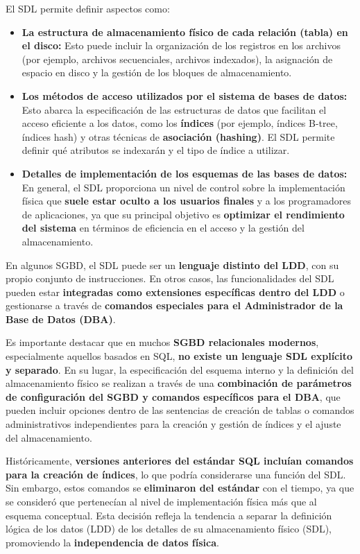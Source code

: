 El SDL permite definir aspectos como:

\begin{itemize}
    \item \textbf{La estructura de almacenamiento físico de cada relación (tabla) en el disco:} Esto puede incluir la organización de los registros en los archivos (por ejemplo, archivos secuenciales, archivos indexados), la asignación de espacio en disco y la gestión de los bloques de almacenamiento.

    \item \textbf{Los métodos de acceso utilizados por el sistema de bases de datos:} Esto abarca la especificación de las estructuras de datos que facilitan el acceso eficiente a los datos, como los \textbf{índices} (por ejemplo, índices B-tree, índices hash) y otras técnicas de \textbf{asociación (hashing)}. El SDL permite definir qué atributos se indexarán y el tipo de índice a utilizar.

    \item \textbf{Detalles de implementación de los esquemas de las bases de datos:} En general, el SDL proporciona un nivel de control sobre la implementación física que \textbf{suele estar oculto a los usuarios finales} y a los programadores de aplicaciones, ya que su principal objetivo es \textbf{optimizar el rendimiento del sistema} en términos de eficiencia en el acceso y la gestión del almacenamiento.
\end{itemize}

En algunos SGBD, el SDL puede ser un \textbf{lenguaje distinto del LDD}, con su propio conjunto de instrucciones. En otros casos, las funcionalidades del SDL pueden estar \textbf{integradas como extensiones específicas dentro del LDD} o gestionarse a través de \textbf{comandos especiales para el Administrador de la Base de Datos (DBA)}.

Es importante destacar que en muchos \textbf{SGBD relacionales modernos}, especialmente aquellos basados en SQL, \textbf{no existe un lenguaje SDL explícito y separado}. En su lugar, la especificación del esquema interno y la definición del almacenamiento físico se realizan a través de una \textbf{combinación de parámetros de configuración del SGBD y comandos específicos para el DBA}, que pueden incluir opciones dentro de las sentencias de creación de tablas o comandos administrativos independientes para la creación y gestión de índices y el ajuste del almacenamiento.

Históricamente, \textbf{versiones anteriores del estándar SQL incluían comandos para la creación de índices}, lo que podría considerarse una función del SDL. Sin embargo, estos comandos se \textbf{eliminaron del estándar} con el tiempo, ya que se consideró que pertenecían al nivel de implementación física más que al esquema conceptual. Esta decisión refleja la tendencia a separar la definición lógica de los datos (LDD) de los detalles de su almacenamiento físico (SDL), promoviendo la \textbf{independencia de datos física}.

